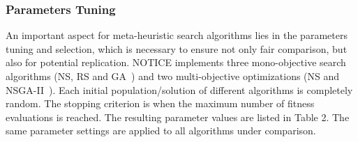 \subsubsection{Parameters Tuning}
An important aspect for meta-heuristic search algorithms lies in the parameters tuning and selection, which is necessary to ensure not only fair comparison, but also for potential replication.
NOTICE implements three mono-objective search algorithms (NS, RS and GA~\cite{cooper2002adaptive}) and two multi-objective optimizations (NS and NSGA-II~\cite{deb2002fast}). Each initial population/solution of different algorithms is completely random. The stopping criterion is when the maximum number of fitness evaluations is reached.
The resulting parameter values are listed in Table 2. The same parameter settings are applied to all algorithms under comparison.

